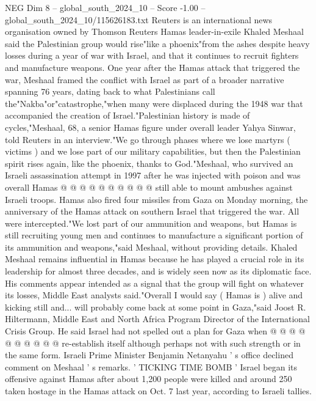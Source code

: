 \begin{textsample}{NEG Dim 8 – global\_south\_2024\_10 – Score -1.00 – global\_south\_2024\_10/115626183.txt}  \label{ex:f8_neg_143}
Reuters is an international news organisation owned by Thomson Reuters Hamas leader-in-exile Khaled Meshaal said the Palestinian group would rise"like a phoenix"from the ashes despite heavy losses during a year of war with Israel, and that it continues to recruit fighters and manufacture weapons.
One year after the Hamas attack that triggered the war, Meshaal framed the conflict with Israel as part of a broader narrative spanning 76 years, dating back to what Palestinians call the"Nakba"or"catastrophe,"when many were displaced during the 1948 war that accompanied the creation of Israel."Palestinian history is made of cycles,"Meshaal, 68, a senior Hamas figure under overall leader Yahya Sinwar, told Reuters in an interview."We go through phases where we lose martyrs ( victims ) and we lose part of our military capabilities, but then the Palestinian spirit rises again, like the phoenix, thanks to God."Meshaal, who survived an Israeli assassination attempt in 1997 after he was injected with poison and was overall Hamas @ @ @ @ @ @ @ @ @ @ still able to mount ambushes against Israeli troops.
Hamas also fired four missiles from Gaza on Monday morning, the anniversary of the Hamas attack on southern Israel that triggered the war.
All were intercepted."We lost part of our ammunition and weapons, but Hamas is still recruiting young men and continues to manufacture a significant portion of its ammunition and weapons,"said Meshaal, without providing details.
Khaled Meshaal remains influential in Hamas because he has played a crucial role in its leadership for almost three decades, and is widely seen now as its diplomatic face.
His comments appear intended as a signal that the group will fight on whatever its losses, Middle East analysts said."Overall I would say ( Hamas is ) alive and kicking still and... will probably come back at some point in Gaza,"said Joost R.
Hiltermann, Middle East and North Africa Program Director of the International Crisis Group.
He said Israel had not spelled out a plan for Gaza when @ @ @ @ @ @ @ @ @ @ re-establish itself although perhaps not with such strength or in the same form.
Israeli Prime Minister Benjamin Netanyahu ' s office declined comment on Meshaal ' s remarks. ' TICKING TIME BOMB ' Israel began its offensive against Hamas after about 1,200 people were killed and around 250 taken hostage in the Hamas attack on Oct. 7 last year, according to Israeli tallies.

\end{textsample}
